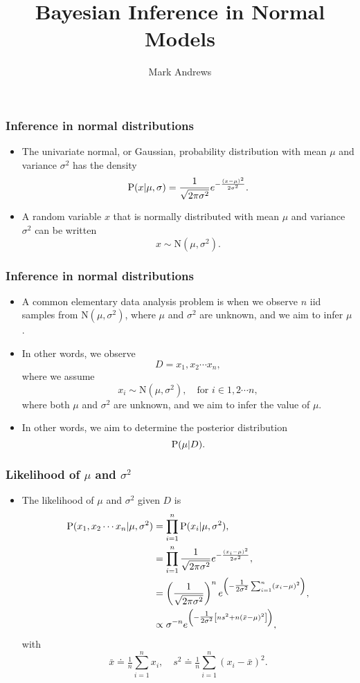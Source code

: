 \documentclass{slides}
\title[Bayesian Inference]{Bayesian Inference in Normal Models}
\author[Andrews]{Mark Andrews}
\begin{document}
{
	\begin{frame}
		\titlepage
	\end{frame}
}


\begin{frame}
	\frametitle{Inference in normal distributions}
	\begin{itemize}
		\item The univariate normal, or Gaussian, probability distribution with mean $\mu$ and variance $\sigma^2$ has the density
			\[
				\mathrm{P}( x\vert\mu,\sigma ) = \frac{1}{\sqrt{2\pi\sigma^2}}e^{-\frac{(x-\mu)^2}{2\sigma^2}}.
			\]
		\item A random variable $x$ that is normally distributed with mean $\mu$ and variance $\sigma^2$ can be written
			\[
				x \sim \textrm{N}(\mu, \sigma^2).
			\]

	\end{itemize}
\end{frame}

\begin{frame}
	\frametitle{Inference in normal distributions}
	\begin{itemize}
		\item A common elementary data analysis problem is when we
			observe $n$ iid samples from $\textrm{N}(\mu, \sigma^2)$, where
			$\mu$ and $\sigma^2$ are unknown, and we aim to infer
			$\mu$.

		\item In other words, we observe
			\[D = x_1, x_2 \cdots x_n,\]
			where we assume
			\[x_i \sim \textrm{N}(\mu, \sigma^2),\quad\text{for $i \in 1,2\cdots n$},\]
		      where both $\mu$ and $\sigma^2$ are unknown, and we aim to infer the value of $\mu$. 
		\item In other words, we aim to determine the posterior distribution
		      \[
			\mathrm{P}( \mu \vert D ).
		      \]
	\end{itemize}
\end{frame}


\begin{frame}
	\frametitle{Likelihood of $\mu$ and $\sigma^2$}
	\begin{itemize}
		\item The likelihood of $\mu$ and $\sigma^2$ given $D$ is 
			\begin{align*}
				\mathrm{P}( x_1, x_2 \cdots x_n \vert \mu, \sigma^2 ) &= \prod_{i=1}^n \mathrm{P}( x_i \vert \mu, \sigma^2 ),\\
				&= \prod_{i=1}^n \frac{1}{\sqrt{2\pi\sigma^2}}e^{-\frac{(x_i-\mu)^2}{2\sigma^2}},\\
				&= \left(\frac{1}{\sqrt{2\pi\sigma^2}}\right)^n e^{\left(-\tfrac{1}{2\sigma^2}\sum_{i=1}^{n}(x_i - \mu)^2\right)},\\
				&\propto \sigma^{-n} e^{\left( -\tfrac{1}{2\sigma^2}\left[n s^2 + n(\bar{x}-\mu)^2\right] \right)},
			\end{align*}
			with \[
				\bar{x} \doteq \tfrac{1}{n} \sum_{i=1}^n x_i, \quad s^2 \doteq \tfrac{1}{n} \sum_{i=1}^n (x_i - \bar{x})^2.
			\]
	\end{itemize}

\end{frame}
\end{document}
